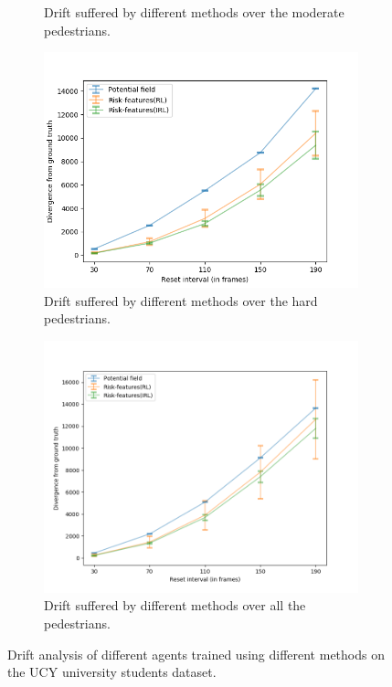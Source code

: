 \begin{figure}[htbp]
\begin{subfigure}{0.5\textwidth}
		\caption{Drift suffered by different methods over the moderate pedestrians.}
		\label{fig:inter_method-drift_analysis_med}
	\end{subfigure}
	\begin{subfigure}{0.5\textwidth}
		\centering
		\includegraphics[width=\linewidth]{plots/plot_without_outliers/ucy_inter_method_no_outlier/drift_analysis_hard_no_outliers.png}
		\caption{Drift suffered by different methods over the hard pedestrians.}
		\label{fig:inter_method-drift_analysis_hard}
	\end{subfigure}
	\begin{subfigure}{0.5\textwidth}
		\centering
		\includegraphics[width=\linewidth]{plots/plot_without_outliers/ucy_inter_method_no_outlier/drift_analysis_all_no_outliers.png}
		\caption{Drift suffered by different methods over all the pedestrians.}
		\label{fig:inter_method-drift_analysis_all}
	\end{subfigure}
	\caption{Drift analysis of different agents trained using different methods on the UCY university students dataset.}
\end{figure}


